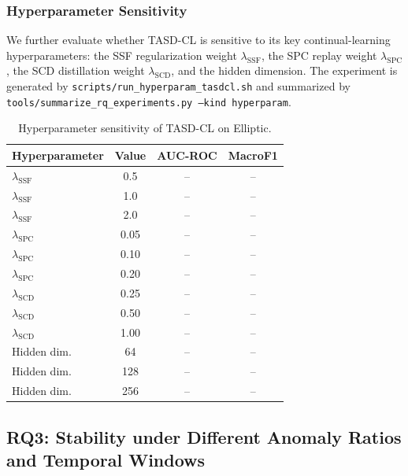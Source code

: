 \subsubsection{Hyperparameter Sensitivity}
\label{subsubsec:hyperparameter-sensitivity}

We further evaluate whether TASD-CL is sensitive to its key continual-learning hyperparameters: the SSF regularization weight $\lambda_{\mathrm{SSF}}$, the SPC replay weight $\lambda_{\mathrm{SPC}}$, the SCD distillation weight $\lambda_{\mathrm{SCD}}$, and the hidden dimension. The experiment is generated by \texttt{scripts/run\_hyperparam\_tasdcl.sh} and summarized by \texttt{tools/summarize\_rq\_experiments.py --kind hyperparam}.

\begin{table}[!htbp]
  \centering
  \caption{Hyperparameter sensitivity of TASD-CL on Elliptic.}
  \label{tab:hyperparameter-sensitivity}
  \scriptsize
  \setlength{\tabcolsep}{3pt}
  \begin{tabular*}{\columnwidth}{@{\extracolsep{\fill}}lccc@{}}
    \toprule
    Hyperparameter & Value & AUC-ROC & MacroF1 \\
    \midrule
    $\lambda_{\mathrm{SSF}}$ & 0.5 & -- & -- \\
    $\lambda_{\mathrm{SSF}}$ & 1.0 & -- & -- \\
    $\lambda_{\mathrm{SSF}}$ & 2.0 & -- & -- \\
    \midrule
    $\lambda_{\mathrm{SPC}}$ & 0.05 & -- & -- \\
    $\lambda_{\mathrm{SPC}}$ & 0.10 & -- & -- \\
    $\lambda_{\mathrm{SPC}}$ & 0.20 & -- & -- \\
    \midrule
    $\lambda_{\mathrm{SCD}}$ & 0.25 & -- & -- \\
    $\lambda_{\mathrm{SCD}}$ & 0.50 & -- & -- \\
    $\lambda_{\mathrm{SCD}}$ & 1.00 & -- & -- \\
    \midrule
    Hidden dim. & 64 & -- & -- \\
    Hidden dim. & 128 & -- & -- \\
    Hidden dim. & 256 & -- & -- \\
    \bottomrule
  \end{tabular*}
\end{table}
\FloatBarrier

\subsection{RQ3: Stability under Different Anomaly Ratios and Temporal Windows}
\label{subsec:stability-analysis}

